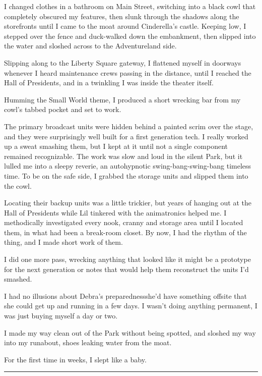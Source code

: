 I changed clothes in a bathroom on Main Street, switching into a
black cowl that completely obscured my features, then slunk through
the shadows along the storefronts until I came to the moat around
Cinderella's castle. Keeping low, I stepped over the fence and
duck-walked down the embankment, then slipped into the water and
sloshed across to the Adventureland side.

Slipping along to the Liberty Square gateway, I flattened myself in
doorways whenever I heard maintenance crews passing in the
distance, until I reached the Hall of Presidents, and in a
twinkling I was inside the theater itself.

Humming the Small World theme, I produced a short wrecking bar from
my cowl's tabbed pocket and set to work.

The primary broadcast units were hidden behind a painted scrim over
the stage, and they were surprisingly well built for a first
generation tech. I really worked up a sweat smashing them, but I
kept at it until not a single component remained recognizable. The
work was slow and loud in the silent Park, but it lulled me into a
sleepy reverie, an autohypnotic swing-bang-swing-bang timeless
time. To be on the safe side, I grabbed the storage units and
slipped them into the cowl.

Locating their backup units was a little trickier, but years of
hanging out at the Hall of Presidents while Lil tinkered with the
animatronics helped me. I methodically investigated every nook,
cranny and storage area until I located them, in what had been a
break-room closet. By now, I had the rhythm of the thing, and I
made short work of them.

I did one more pass, wrecking anything that looked like it might be
a prototype for the next generation or notes that would help them
reconstruct the units I'd smashed.

I had no illusions about Debra's preparedness{\dash}she'd have something
offsite that she could get up and running in a few days. I wasn't
doing anything permanent, I was just buying myself a day or two.

I made my way clean out of the Park without being spotted, and
sloshed my way into my runabout, shoes leaking water from the
moat.

For the first time in weeks, I slept like a baby.

\begin{center}\rule{3in}{0.4pt}\end{center}

